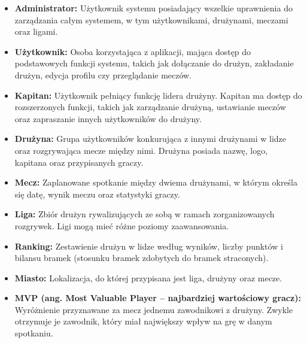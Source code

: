 \documentclass[wmii,inf,inz]{uwmthesis} %
\newenvironment{indenteditemize}
{\begin{itemize}[left=1cm]} %
{\end{itemize}}
\begin{document}
\begin{indenteditemize}
 \item\textbf{Administrator: }
    Użytkownik systemu posiadający wszelkie uprawnienia do zarządzania całym systemem, w tym użytkownikami, drużynami, meczami oraz ligami.\newline

    \item\textbf{Użytkownik: }
    Osoba korzystająca z aplikacji, mająca dostęp do podstawowych funkcji systemu, takich jak dołączanie do drużyn, zakładanie drużyn, edycja profilu czy przeglądanie meczów.\newline

    \item\textbf{Kapitan: } 
    Użytkownik pełniący funkcję lidera drużyny. Kapitan ma dostęp do rozszerzonych funkcji, takich jak zarządzanie drużyną, ustawianie meczów oraz zapraszanie innych użytkowników do drużyny.\newline

    \item\textbf{Drużyna: }
    Grupa użytkowników konkurująca z innymi drużynami w lidze oraz rozgrywająca mecze między nimi. Drużyna posiada nazwę, logo, kapitana oraz przypisanych graczy.\newline

    \item\textbf{Mecz: } 
    Zaplanowane spotkanie między dwiema drużynami, w którym określa się datę, wynik meczu oraz statystyki graczy.\newline

    \item\textbf{Liga: } 
    Zbiór drużyn rywalizujących ze sobą w ramach zorganizowanych rozgrywek. Ligi mogą mieć różne poziomy zaawansowania.\newline

    \item\textbf{Ranking: } 
    Zestawienie drużyn w lidze według wyników, liczby punktów i bilansu bramek (stosunku bramek zdobytych do bramek straconych).\newline

    \item\textbf{Miasto: } 
    Lokalizacja, do której przypisana jest liga, drużyny oraz mecze.\newline

    \item\textbf{MVP (ang. Most Valuable Player – najbardziej wartościowy gracz): } 
    Wyróżnienie przyznawane za mecz jednemu zawodnikowi z drużyny. Zwykle otrzymuje je zawodnik, który miał największy wpływ na grę w danym spotkaniu.\newline


\end{indenteditemize}
\end{document}
